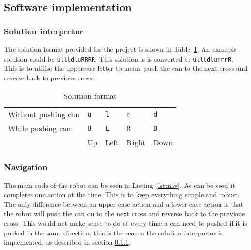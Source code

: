 \documentclass[../../main.tex]{subfiles}
\begin{document}
\subsection{Software implementation}%
\label{sub:software_implementation}

\subsubsection{Solution interpretor}%
\label{ssub:solution_intepretor}

The solution format provided for the project is shown in Table~\ref{tab:solution_format}.
An example solution could be \texttt{ullldluRRRR}.
This solution is is converted to \texttt{ullldlurrrR}. This is to utilise the uppercase letter to
mean, push the can to the next cross and reverse back to previous cross.

\begin{table}[h]
	\centering
	\caption{Solution format}
	\label{tab:solution_format}
	\begin{tabular}{*{5}{l}}
		\toprule
		Without pushing can & \tt u &\tt  l & \tt r & \tt d \\
		While pushing can & \tt U & \tt L & \tt R & \tt D \\
		\cmidrule{2-5}
											& Up & Left & Right & Down\\
											\bottomrule
	\end{tabular}
\end{table}


\subsubsection{Navigation}%
\label{ssub:navigation}

The main code of the robot can be seen in Listing~\ref{lst:nav}.
As can be seen it completes one action at the time.
This is to keep everything simple and robust.
The only difference between an upper case action and a lower case action
is that the robot will push the can on to the next cross and reverse back to the previous
cross. This would not make sense to do at every time a can need to pushed if it is pushed in
the same direction, this is the reason the solution interpretor is implemented, as described in
section \ref{ssub:solution_intepretor}.
\end{document}
